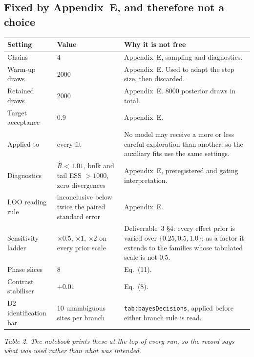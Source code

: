 \documentclass[10pt,a4paper]{article}
\newcommand{\code}[1]{\texttt{\UseBreakableUnderscores #1}}
\newcommand{\UseBreakableUnderscores}{\def\_{\textunderscore\allowbreak}}
\begin{document}
\subsection{Fixed by Appendix~E, and therefore not a choice}
\begin{center}\small
\begin{tabularx}{\textwidth}{@{}L{3.2cm}L{4cm}Y@{}}
\toprule
\textbf{Setting} & \textbf{Value} & \textbf{Why it is not free}\\
\midrule
Chains & 4 & Appendix~E, sampling and diagnostics.\\
Warm-up draws & 2000 & Appendix~E. Used to adapt the step size, then discarded.\\
Retained draws & 2000 & Appendix~E. 8000 posterior draws in total.\\
Target acceptance & 0.9 & Appendix~E.\\
Applied to & every fit & No model may receive a more or less careful exploration than another, so the auxiliary fits use the same settings.\\
Diagnostics & $\hat R<1.01$, bulk and tail ESS $>1000$, zero divergences & Appendix~E, preregistered and gating interpretation.\\
LOO reading rule & inconclusive below twice the paired standard error & Appendix~E.\\
Sensitivity ladder & $\times0.5$, $\times1$, $\times2$ on every prior scale & Deliverable~3 §4: every effect prior is varied over $\{0.25,0.5,1.0\}$; as a factor it extends to the families whose tabulated scale is not $0.5$.\\
Phase slices & 8 & Eq.~(11).\\
Contrast stabiliser & $+0.01$ & Eq.~(8).\\
D2 identification bar & 10 unambiguous sites per branch & \code{tab:bayesDecisions}, applied before either branch rule is read.\\
\bottomrule
\end{tabularx}
\end{center}
{\small\itshape Table 2. The notebook prints these at the top of every run, so the record says what was used rather than what was intended.}
\end{document}
